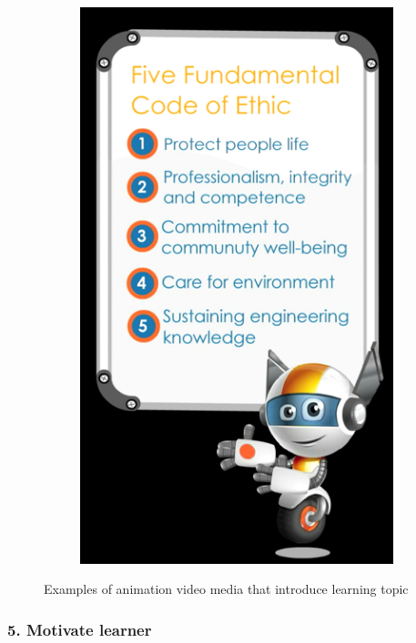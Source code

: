 \begin{figure}[H]
\begin{subfigure}{0.25\textwidth}
\includegraphics[width=\textwidth]{video3}
\caption{}
    \end{subfigure}\hspace{0.03\textwidth}
  \caption{Examples of animation video media that introduce learning topic}
\end{figure}

\newpage 
\subsubsection{5. Motivate learner}

